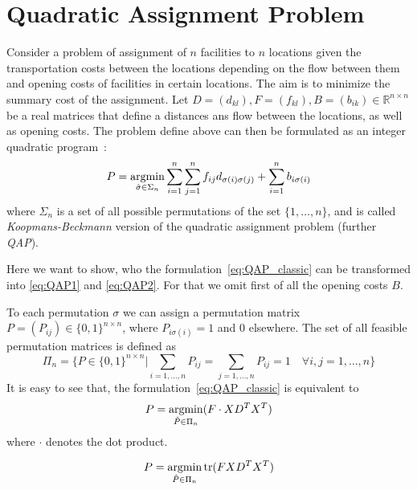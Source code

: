 \chapter{Quadratic Assignment Problem}
Consider a problem of assignment of $n$ facilities to $n$ locations given the transportation costs between the locations depending on the flow between them and opening costs of facilities in certain locations. The aim is to minimize the summary cost of the assignment. Let $D=(d_{kl}),F=(f_{kl}), B=(b_{ik})\in\mathbb{R}^{n\times n}$ be a real matrices that define a distances ans flow between the locations, as well as opening costs. The problem define above can then be formulated as an integer quadratic program~\cite{Burkard98thequadratic,Koopman_Backman}:
\begin{equation}\label{eq:QAP_classic}
P = \mathop{\rm argmin}_{\hat{\sigma}\in\Sigma_n}\sum_{i=1}^{n}\sum_{j=1}^{n}f_{ij}d_{\sigma(i)\sigma(j)}+\sum_{i=1}^{n}b_{i\sigma(i)}
\end{equation}
where $\Sigma_n$ is a set of all possible permutations of the set $\{1,\dots,n\}$, and is called \emph{Koopmans-Beckmann} version of the quadratic assignment problem (further \emph{QAP}). 

Here we want to show, who the formulation~\eqref{eq:QAP_classic} can be transformed into \eqref{eq:QAP1} and \eqref{eq:QAP2}. For that we omit first of all the opening costs $B$.

To each permutation $\sigma$ we can assign a permutation matrix $P=(P_{ij})\in\{0,1\}^{n\times n}$, where $P_{i\sigma(i)}=1$ and $0$ elsewhere. The set of all feasible permutation matrices is defined as
\begin{equation*}
\Pi_n=\{P\in\{0,1\}^{n\times n}|\sum_{i=1,\dots,n}P_{ij}=\sum_{j=1,\dots,n}P_{ij}=1\quad\forall i,j=1,\dots,n\}
\end{equation*}
It is easy to see that, the formulation~\eqref{eq:QAP_classic} is equivalent to
\begin{equation}\label{eq:QAP_classic2}
P = \mathop{\rm argmin}_{\hat{P}\in\Pi_n}(F\cdot XD^TX^T)
\end{equation}
where $\cdot$ denotes the dot product.

\begin{equation}\label{eq:QAP_classic3}
P = \mathop{\rm argmin}_{\hat{P}\in\Pi_n}\mathop{\rm tr}(FXD^TX^T)
\end{equation}